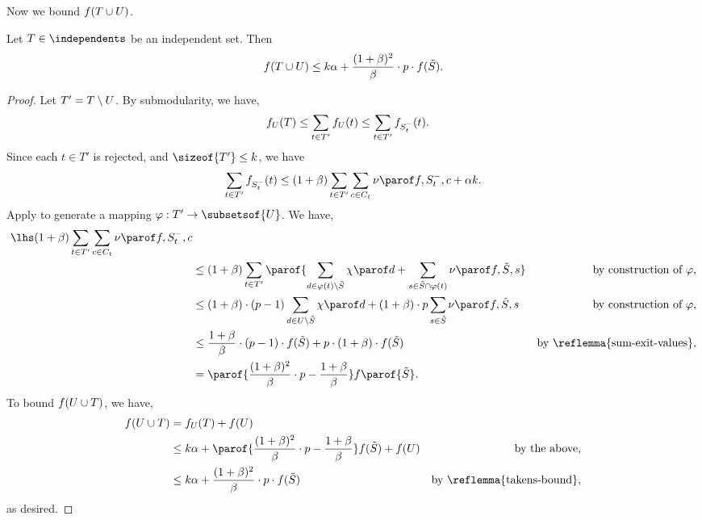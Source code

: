 \documentclass[oneside,letterpaper]{scrartcl} \usepackage{macros}
\begin{document}
Now we bound $f(T \cup U)$.
\begin{lemma}
  Let $T \in \independents$ be an independent set. Then
  \begin{align*}
    f(T \cup U) \leq k \alpha + \frac{(1 + \beta)^2}{\beta} \cdot p \cdot f(\tilde{S}).
  \end{align*}
\end{lemma}
\begin{proof}
  Let $T' = T \setminus U$. By submodularity, we have,
  \begin{align*}
    f_U(T) &\leq \sum_{t \in T'} f_U(t) \leq \sum_{t \in T'} f_{S_{t}^-}(t).
  \end{align*}
  Since each $t \in T'$ is rejected, and $\sizeof{T'} \leq k$, we have
  \begin{align*}
    \sum_{t \in T'} f_{\setbefore{t}}(t) \leq (1+\beta) \sum_{t \in T'} \sum_{c \in \candidatesfor{t}}
    \incvalueof{f}{\setbefore{t}}{c} + \alpha k.  \end{align*}
  Apply  to generate
  a mapping $\varphi: T' \to \subsetsof{\takens}$. We have,
  \begin{align*}
    \lhs (1+\beta) \sum_{t \in T'} \sum_{c \in \candidatesfor{t}}
    \incvalueof{f}{\setbefore{t}}{c} \\&\leq (1+\beta)\sum_{t \in T'} \parof{\sum_{\deleted \in \varphi(t) \setminus \finalset}
      \exitvalueof{\deleted} + \sum_{s \in \finalset \cap \varphi(t)}
      \incvalueof{f}{\finalset}{s}} &\text{by construction of $\varphi$,}\\
    &\leq (1+\beta) \cdot (p-1) \sum_{d \in \deleteds} \exitvalueof{d} +
    (1+\beta) \cdot p \sum_{s \in \finalset}
    \incvalueof{f}{\finalset}{s} &\text{by construction of $\varphi$,}\\
    &\leq \frac{1+\beta}{\beta} \cdot (p-1) \cdot f(\finalset) + p \cdot (1
    + \beta) \cdot f(\finalset) &\text{by \reflemma{sum-exit-values},}\\ &= \parof{\frac{(1+\beta)^2}{\beta} \cdot p -
      \frac{1+\beta}{\beta}}f\parof{\finalset}.
  \end{align*}
  To bound $f(U \cup T)$, we have,
  \begin{align*}
    f(\takens \cup T) &= f_{\takens}(T) + f(\takens) \\
    &\leq k \alpha + \parof{\frac{(1 + \beta)^2}{\beta} \cdot p -
      \frac{1+\beta}{\beta}} f (\finalset) + f(\takens) &\text{by the above,} \\
    &\leq k \alpha + \frac{(1 + \beta)^2}{\beta} \cdot p \cdot f
    (\finalset) &\text{by \reflemma{takens-bound}},
  \end{align*}
  as desired.
\end{proof}
\end{document}
